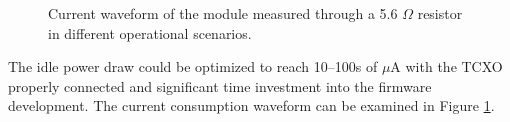 \begin{figure}
    \centering
     \hfil
    \caption{\label{fig:module-current}Current waveform of the module measured through a 5.6 $\Omega$ resistor in different operational scenarios.}
\end{figure}

The idle power draw could be optimized to reach 10--100s of $\mu$A with the TCXO properly connected and significant time investment into the firmware development. The current consumption waveform can be examined in Figure \ref{fig:module-current}.


